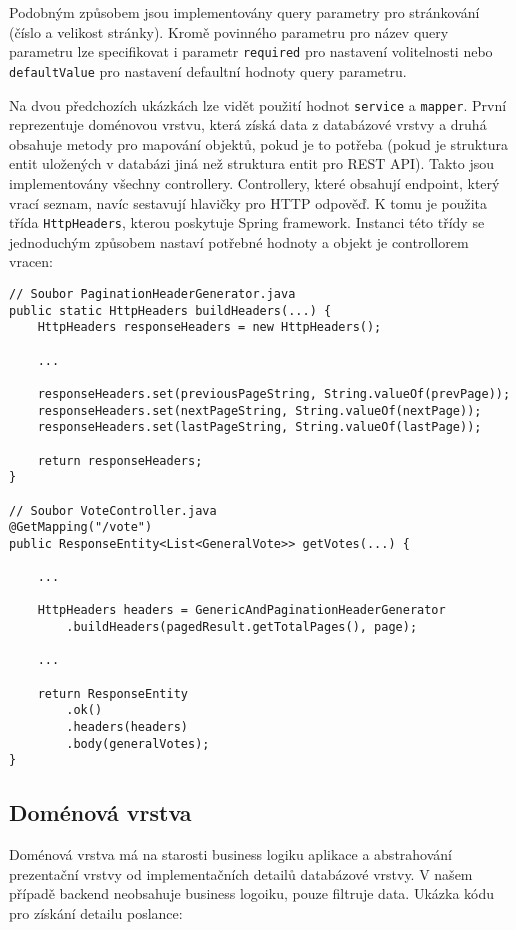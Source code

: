 \noindent Podobným způsobem jsou implementovány query parametry pro stránkování (číslo a velikost stránky). Kromě povinného parametru pro název query parametru lze specifikovat i parametr \lstinline|required| pro nastavení volitelnosti nebo  \lstinline|defaultValue| pro nastavení defaultní hodnoty query parametru.

\vspace{10px}
\noindent Na dvou předchozích ukázkách lze vidět použití hodnot \lstinline|service| a \lstinline|mapper|. První reprezentuje doménovou vrstvu, která získá data z databázové vrstvy a druhá obsahuje metody pro mapování objektů, pokud je to potřeba (pokud je struktura entit uložených v databázi jiná než struktura entit pro REST API). Takto jsou implementovány všechny controllery. Controllery, které obsahují endpoint, který vrací seznam, navíc sestavují hlavičky pro HTTP odpověď. K tomu je použita třída \lstinline|HttpHeaders|, kterou poskytuje Spring framework. Instanci této třídy se jednoduchým způsobem nastaví potřebné hodnoty a objekt je controllorem vracen:

\begin{lstlisting}[caption={Ukázka nastavení hlaviček pro stránkování}, label={lst:headers-paging}, tabsize=2]
// Soubor PaginationHeaderGenerator.java
public static HttpHeaders buildHeaders(...) {
	HttpHeaders responseHeaders = new HttpHeaders();

	...
	
	responseHeaders.set(previousPageString, String.valueOf(prevPage));
	responseHeaders.set(nextPageString, String.valueOf(nextPage));
	responseHeaders.set(lastPageString, String.valueOf(lastPage));
	
	return responseHeaders;
}

// Soubor VoteController.java
@GetMapping("/vote")
public ResponseEntity<List<GeneralVote>> getVotes(...) {

	...
	
	HttpHeaders headers = GenericAndPaginationHeaderGenerator
		.buildHeaders(pagedResult.getTotalPages(), page);
	
	...	
	
	return ResponseEntity
		.ok()
		.headers(headers)
		.body(generalVotes);
}
\end{lstlisting}

\subsection {Doménová vrstva}
Doménová vrstva má na starosti business logiku aplikace a abstrahování prezentační vrstvy od implementačních detailů databázové vrstvy. V našem případě backend neobsahuje business logoiku, pouze filtruje data. Ukázka kódu pro získání detailu poslance:

